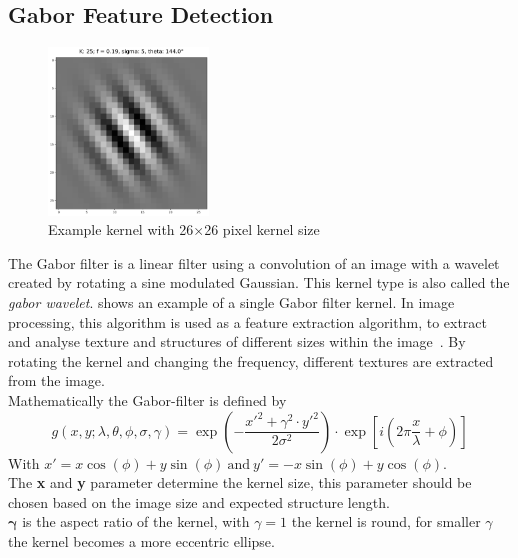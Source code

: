 \documentclass[12pt,a4paper, english,twoside]{scrartcl}
\begin{document}
    \subsection{Gabor Feature Detection}\label{sec:gabor}
      \begin{figure}
      \vspace{-1cm}
       \begin{center}
         \includegraphics[width=0.38\textwidth]{img/KLarge.png}
       \end{center}
       \caption{Example kernel with 26$\times$26 pixel kernel size}\label{fig:largeKernel}
      \end{figure}
      The Gabor filter is a linear filter using a convolution of an image with a wavelet created by rotating a sine modulated Gaussian. 
      This kernel type is also called the \textit{gabor wavelet}.
       shows an example of a single Gabor filter kernel.
      In image processing, this algorithm is used as a feature extraction algorithm, to extract and analyse texture and structures of different sizes within the image~\autocite{Cerdan1993}. 
      By rotating the kernel and changing the frequency, different textures are extracted from the image.\\
      Mathematically the Gabor-filter is defined by
      \begin{equation}
        g(x,y; \lambda, \theta, \phi, \sigma, \gamma) = \exp \left(- \frac{x'^2 + \gamma^2\cdot y'^2}{2\sigma^2}\right) \cdot \exp \left[i \left(2\pi\frac{x}{\lambda} + \phi \right)\right] 
      \end{equation}
      With $ x' = x \cos(\phi) + y \sin(\phi)~\text{and}~y' = -x \sin(\phi) + y \cos(\phi)$.\\ 
      The \textbf{x} and \textbf{y} parameter determine the kernel size, this parameter should be chosen based on the image size and expected structure length.\\
      $\boldsymbol{\gamma}$ is the aspect ratio of the kernel, with $\gamma = 1$ the kernel is round, for smaller $\gamma$ the kernel becomes a more eccentric ellipse.\\
\end{document}
